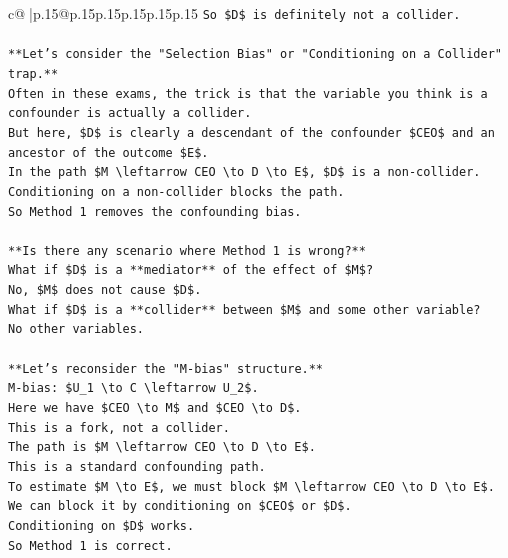 \documentclass{article}
\begin{document}
{\begin{supertabular}{c@{$\;$}|p{.15\linewidth}@{}p{.15\linewidth}p{.15\linewidth}p{.15\linewidth}p{.15\linewidth}p{.15\linewidth}}
{{{\texttt{So \$D\$ is definitely not a collider.} \\
\\ 
\texttt{**Let's consider the "Selection Bias" or "Conditioning on a Collider" trap.**} \\
\texttt{Often in these exams, the trick is that the variable you think is a confounder is actually a collider.} \\
\texttt{But here, \$D\$ is clearly a descendant of the confounder \$CEO\$ and an ancestor of the outcome \$E\$.} \\
\texttt{In the path \$M \textbackslash{}leftarrow CEO \textbackslash{}to D \textbackslash{}to E\$, \$D\$ is a non{-}collider.} \\
\texttt{Conditioning on a non{-}collider blocks the path.} \\
\texttt{So Method 1 removes the confounding bias.} \\
\\ 
\texttt{**Is there any scenario where Method 1 is wrong?**} \\
\texttt{What if \$D\$ is a **mediator** of the effect of \$M\$?} \\
\texttt{No, \$M\$ does not cause \$D\$.} \\
\texttt{What if \$D\$ is a **collider** between \$M\$ and some other variable?} \\
\texttt{No other variables.} \\
\\ 
\texttt{**Let's reconsider the "M{-}bias" structure.**} \\
\texttt{M{-}bias: \$U\_1 \textbackslash{}to C \textbackslash{}leftarrow U\_2\$.} \\
\texttt{Here we have \$CEO \textbackslash{}to M\$ and \$CEO \textbackslash{}to D\$.} \\
\texttt{This is a fork, not a collider.} \\
\texttt{The path is \$M \textbackslash{}leftarrow CEO \textbackslash{}to D \textbackslash{}to E\$.} \\
\texttt{This is a standard confounding path.} \\
\texttt{To estimate \$M \textbackslash{}to E\$, we must block \$M \textbackslash{}leftarrow CEO \textbackslash{}to D \textbackslash{}to E\$.} \\
\texttt{We can block it by conditioning on \$CEO\$ or \$D\$.} \\
\texttt{Conditioning on \$D\$ works.} \\
\texttt{So Method 1 is correct.} \\
}}}
\end{supertabular}}
\end{document}
